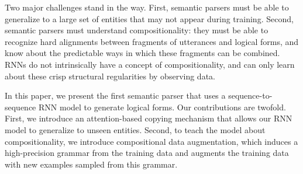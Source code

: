 \documentclass[11pt,letterpaper]{article}
\newcommand\pl[1]{\textcolor{red}{[PL: #1]}}
\renewcommand\pl[1]{}
\begin{document}

Two major challenges stand in the way.
First, semantic parsers must be able to generalize to 
a large set of entities that may not appear during training.
Second, semantic parsers must understand compositionality:
they must be able to recognize
hard alignments between fragments of utterances and logical forms,
and know about the predictable ways in which these fragments can be combined.
RNNs do not intrinsically have a concept of compositionality,
and can only learn about these crisp structural regularities
by observing data.


In this paper, we present the first
semantic parser that uses a sequence-to-sequence RNN model to generate
logical forms.  
Our contributions are twofold.
First, we introduce an attention-based copying mechanism 
that allows our RNN model to generalize to unseen entities.
Second, to teach the model about compositionality,
we introduce compositional data augmentation,
which induces a high-precision grammar from the training data
and augments the training data with new examples sampled from this grammar.

\end{document}
